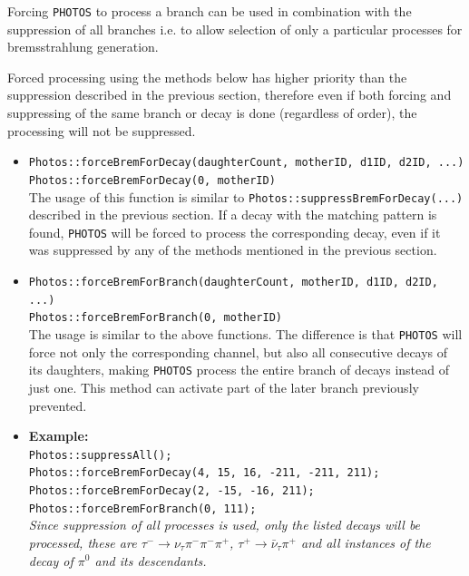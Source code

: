 \documentclass[]{Photos_interface_design}
\begin{document}
Forcing {\tt PHOTOS} to process a branch can be used in combination with
the suppression of all branches i.e. to allow selection of only a particular
processes for bremsstrahlung generation.

Forced processing using the methods below has higher priority than the suppression described
in the previous section, therefore even if both forcing and suppressing of the same
branch or decay is done (regardless of order), the processing will not be
suppressed.

\begin{itemize}

 \item {\tt Photos::forceBremForDecay(daughterCount, motherID, d1ID, d2ID, ...)} \hfill \\
       {\tt Photos::forceBremForDecay(0, motherID)} \hfill \\
       The usage of this function is similar to {\tt Photos::suppressBremForDecay(...)}
	   described in the previous section. If a decay with the matching pattern is found,
	   {\tt PHOTOS} will be forced to process the corresponding decay, even if it was suppressed
	   by any of the methods mentioned in the previous section.
 \item {\tt Photos::forceBremForBranch(daughterCount, motherID, d1ID, d2ID, ...)} \hfill \\
       {\tt Photos::forceBremForBranch(0, motherID)} \hfill \\
       The usage is similar to the above functions. The difference is
	   that {\tt PHOTOS} will force not only the corresponding channel,
	   but also all consecutive decays of its daughters, making {\tt PHOTOS} process the entire branch
	   of decays instead of just one. This method can activate part of the later branch previously prevented.
 \item \textbf{Example:} \hfill \\
{\tt Photos::suppressAll(); } \\
{\tt Photos::forceBremForDecay(4, 15, 16, -211, -211, 211); } \\
{\tt Photos::forceBremForDecay(2, -15, -16, 211); } \\
{\tt Photos::forceBremForBranch(0, 111); } \\
\emph{Since suppression of all processes is used, only the listed decays will be processed,
      these are $\tau^- \rightarrow \nu_\tau \pi^- \pi^- \pi^+$, $\tau^+ \rightarrow \bar \nu_\tau \pi^+$
      and all instances of the decay of $\pi^0$ and its descendants.}
\end{itemize}
\end{document}
